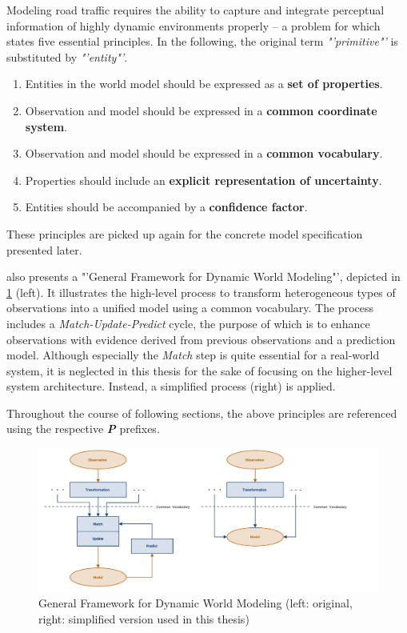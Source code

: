 \begin{samepage}
	Modeling road traffic requires the ability to capture and integrate perceptual information of highly dynamic environments properly – a problem for which \cite{Crowley1993} states five essential principles. In the following, the original term \textit{"'primitive"'} is substituted by \textit{"'entity"'}. 
	
	\begin{enumerate}[\ \ P1:]
		\item Entities in the world model should be expressed as a \textbf{set of properties}.
		\item Observation and model should be expressed in a \textbf{common coordinate system}.
		\item Observation and model should be expressed in a \textbf{common vocabulary}.
		\item Properties should include an \textbf{explicit representation of uncertainty}.
		\item Entities should be accompanied by a \textbf{confidence factor}.
	\end{enumerate}
\end{samepage}

These principles are picked up again for the concrete model specification presented later.

\cite{Crowley1993} also presents a "'General Framework for Dynamic World Modeling"', depicted in \cref{fig:dynamic_world_modeling} (left). It illustrates the high-level process to transform heterogeneous types of observations into a unified model using a common vocabulary. The process includes a \textit{Match-Update-Predict} cycle, the purpose of which is to enhance observations with evidence derived from previous observations and a prediction model. Although especially the \textit{Match} step is quite essential for a real-world system, it is neglected in this thesis for the sake of focusing on the higher-level system architecture. Instead, a simplified process (right) is applied.

Throughout the course of following sections, the above principles are referenced using the respective \textit{\textbf{P}} prefixes.

\begin{figure}
	\centering
	\includegraphics[width=1.0\linewidth]{98_images/dynamic_world_modeling}
	\caption[General Framework for Dynamic World Modeling]{General Framework for Dynamic World Modeling \cite{Crowley1993} (left: original, right: simplified version used in this thesis)}
	\label{fig:dynamic_world_modeling}
\end{figure}

